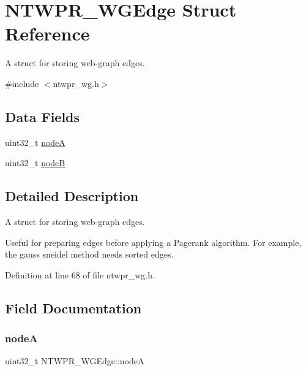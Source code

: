\hypertarget{structNTWPR__WGEdge}{}\section{N\+T\+W\+P\+R\+\_\+\+W\+G\+Edge Struct Reference}
\label{structNTWPR__WGEdge}


A struct for storing web-\/graph edges.  




{\ttfamily \#include $<$ntwpr\+\_\+wg.\+h$>$}

\subsection*{Data Fields}
\begin{DoxyCompactItemize}
\item 
uint32\+\_\+t \mbox{\hyperlink{structNTWPR__WGEdge_a817882eb86490ad61dd36c6ed7ac47f8}{nodeA}}
\item 
uint32\+\_\+t \mbox{\hyperlink{structNTWPR__WGEdge_a0f9b43039574824cc76908125ad3661d}{nodeB}}
\end{DoxyCompactItemize}


\subsection{Detailed Description}
A struct for storing web-\/graph edges. 

Useful for preparing edges before applying a Pagerank algorithm. For example, the gauss sneidel method needs sorted edges. 

Definition at line 68 of file ntwpr\+\_\+wg.\+h.



\subsection{Field Documentation}
\mbox{\label{structNTWPR__WGEdge_a817882eb86490ad61dd36c6ed7ac47f8}} 
\subsubsection{\texorpdfstring{nodeA}{nodeA}}
{\footnotesize\ttfamily uint32\+\_\+t N\+T\+W\+P\+R\+\_\+\+W\+G\+Edge\+::nodeA}

